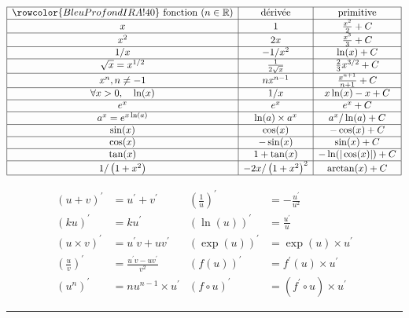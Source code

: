 \begin{f}
\renewcommand{\arraystretch}{1.5}
\[
\begin{array}{|c|c|c|}
\hline \rowcolor{BleuProfondIRA!40} \text { fonction }(n \in \mathbb{R}) & \text { dérivée } & \text { primitive } \\
\hline x & 1 & \frac{x^2}{2}+C \\
\hline x^2 & 2 x & \frac{x^3}{3}+C \\
\hline 1 / x & -1 / x^2 & \ln (x)+C \\
\hline \sqrt{x}=x^{1 / 2} & \frac{1}{2 \sqrt{x}} & \frac{2}{3} x^{3 / 2}+C \\
\hline x^n, n \neq-1 & n x^{n-1} & \frac{x^{n+1}}{n+1}+C \\
\hline \forall x>0, \quad \ln (x) & 1 / x & x \ln (x)-x+C \\
\hline e^x & e^x & e^x+C \\
\hline a^x=e^{x \ln (a)} & \ln (a) \times a^x & a^x / \ln (a)+C \\
\hline \sin (x) & \cos (x) & -\cos (x)+C \\
\hline \cos (x) & -\sin (x) & \sin (x)+C \\
\hline \tan (x) & 1+\tan (x) & -\ln (|\cos (x)|)+C \\
\hline 1 /\left(1+x^2\right) & -2 x /\left(1+x^2\right)^2 & \arctan (x)+C \\
\hline
\end{array}
\]
\renewcommand{\arraystretch}{1}

\[
    \begin{array}{rl|rl}
(u+v)^{\prime} & =u^{\prime}+v^{\prime} & \left(\frac{1}{u}\right)^{\prime} & =-\frac{u^{\prime}}{u^2} \\
(k u)^{\prime} & =k u^{\prime} & (\ln (u))^{\prime} & =\frac{u^{\prime}}{u} \\
(u \times v)^{\prime} & =u^{\prime} v+u v^{\prime} & (\exp (u))^{\prime} & =\exp (u) \times u^{\prime} \\
\left(\frac{u}{v}\right)^{\prime} & =\frac{u^{\prime} v-u v^{\prime}}{v^2} & (f(u))^{\prime} & =f^{\prime}(u) \times u^{\prime} \\
\left(u^n\right)^{\prime} & =n u^{n-1} \times u^{\prime} & (f \circ u)^{\prime} & =\left(f^{\prime} \circ u\right) \times u^{\prime}
\end{array}
\]
\end{f}

\hrule

